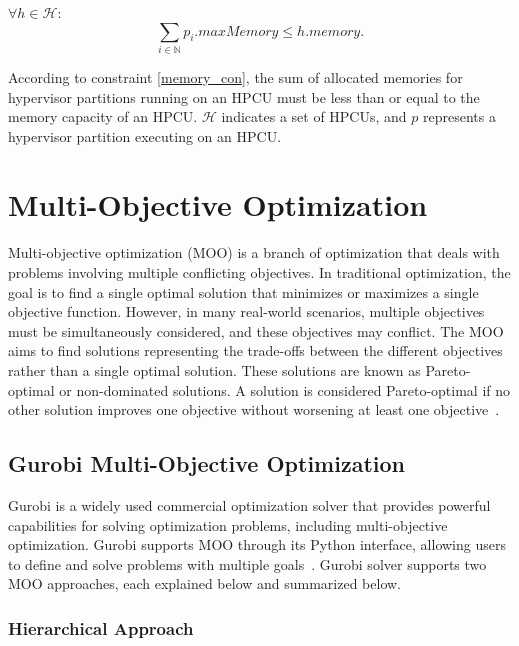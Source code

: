        
        $\forall h \in \mathcal{H}:$ \\
        \begin{equation}
        \sum_{i \in \mathbb{N} } p_i.maxMemory \le h.memory.
        \label{memory_con}
        \end{equation}
    
    According to constraint \eqref{memory_con}, the sum of allocated memories for hypervisor partitions running on an HPCU must be less than or equal to the memory capacity of an HPCU. $\mathcal{H}$ indicates a set of HPCUs, and $p$ represents a hypervisor partition executing on an HPCU.
 
    
    \section{Multi-Objective Optimization}
    
    Multi-objective optimization (MOO) is a branch of optimization that deals with problems involving multiple conflicting objectives. In traditional optimization, the goal is to find a single optimal solution that minimizes or maximizes a single objective function. However, in many real-world scenarios, multiple objectives must be simultaneously considered, and these objectives may conflict.
    The MOO aims to find solutions representing the trade-offs between the different objectives rather than a single optimal solution. These solutions are known as Pareto-optimal or non-dominated solutions. A solution is considered Pareto-optimal if no other solution improves one objective without worsening at least one objective~\cite{gunantara2018review, askaripoor2022architecture, 9613692, askaripoor2023designer}.
    
    \subsection{Gurobi Multi-Objective Optimization}
    Gurobi is a widely used commercial optimization solver that provides powerful capabilities for solving optimization problems, including multi-objective optimization. Gurobi supports MOO through its Python interface, allowing users to define and solve problems with multiple goals~\cite{gurobi}. Gurobi solver supports two MOO approaches, each explained below and summarized below.  %
    \subsubsection{Hierarchical Approach}
    
